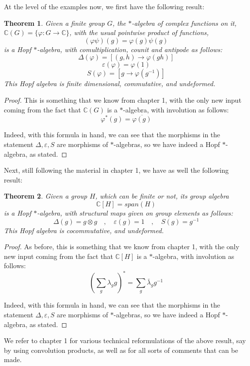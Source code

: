 \documentclass[12pt]{amsbook}
\newtheorem{theorem}{Theorem}[chapter]
\begin{document}
\bigskip

At the level of the examples now, we first have the following result:

\begin{theorem}
Given a finite group $G$, the $*$-algebra of complex functions on it, $\mathbb C(G)=\{\varphi:G\to\mathbb C\}$, with the usual pointwise product of functions,
$$(\varphi\psi)(g)=\varphi(g)\psi(g)$$
is a Hopf $*$-algebra, with comultiplication, counit and antipode as follows:
$$\Delta(\varphi)=[(g,h)\to \varphi(gh)]$$
$$\varepsilon(\varphi)=\varphi(1)$$
$$S(\varphi)=[g\to\varphi(g^{-1})]$$
This Hopf algebra is finite dimensional, commutative, and undeformed.
\end{theorem}

\begin{proof}
This is something that we know from chapter 1, with the only new input coming from the fact that $\mathbb C(G)$ is a $*$-algebra, with involution as follows:
$$\varphi^*(g)=\overline{\varphi(g)}$$

Indeed, with this formula in hand, we can see that the morphisms in the statement $\Delta,\varepsilon,S$ are morphisms of $*$-algebras, so we have indeed a Hopf $*$-algebra, as stated.
\end{proof}

Next, still following the material in chapter 1, we have as well the following result:

\begin{theorem}
Given a group $H$, which can be finite or not, its group algebra
$$\mathbb C[H]=span(H)$$
is a Hopf $*$-algebra, with structural maps given on group elements as follows:
$$\Delta(g)=g\otimes g\quad,\quad
\varepsilon(g)=1\quad,\quad
S(g)=g^{-1}$$
This Hopf algebra is cocommutative, and undeformed.
\end{theorem}

\begin{proof}
As before, this is something that we know from chapter 1, with the only new input coming from the fact that $\mathbb C[H]$ is a $*$-algebra, with involution as follows:
$$\left(\sum_g\lambda_gg\right)^*=\sum_g\bar{\lambda}_gg^{-1}$$

Indeed, with this formula in hand, we can see that the morphisms in the statement $\Delta,\varepsilon,S$ are morphisms of $*$-algebras, so we have indeed a Hopf $*$-algebra, as stated.
\end{proof}

We refer to chapter 1 for various technical reformulations of the above result, say by using convolution products, as well as for all sorts of comments that can be made.
\end{document}
